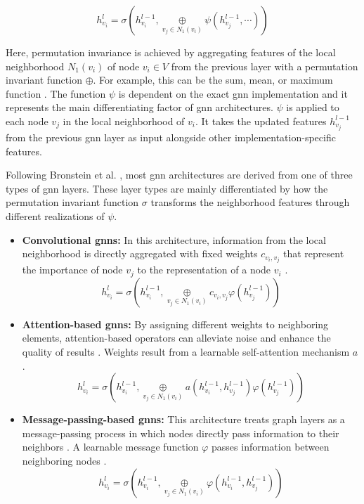 \begin{equation}
    h_{v_i}^l = \sigma(h_{v_i}^{l-1}, \underset{v_j \in N_1(v_i)}{\oplus} \psi(h_{v_j}^{l-1}, \cdots))
\end{equation}

Here, permutation invariance is achieved by aggregating features of the local neighborhood $N_1(v_i)$ of node $v_i \in V$ from the previous layer with a permutation invariant function $\oplus$. For example, this can be the sum, mean, or maximum function \cite{bronstein_geometric_2021}. The function $\psi$ is dependent on the exact \gls{gnn} implementation and it represents the main differentiating factor of \gls{gnn} architectures. $\psi$ is applied to each node $v_j$ in the local neighborhood of $v_i$. It takes the updated features $h_{v_j}^{l-1}$ from the previous \gls{gnn} layer as input alongside other implementation-specific features.

Following Bronstein et al. \cite{bronstein_geometric_2021}, most \gls{gnn} architectures are derived from one of three types of \gls{gnn} layers. These layer types are mainly differentiated by how the permutation invariant function $\sigma$ transforms the neighborhood features through different realizations of $\psi$.

\begin{itemize}
    \item \textbf{Convolutional \glspl{gnn}:} In this architecture, information from the local neighborhood is directly aggregated with fixed weights $c_{v_i, v_j}$ that represent the importance of node $v_j$ to the representation of a node $v_i$ \cite{bronstein_geometric_2021, wu_comprehensive_2021}.
    \begin{equation}
        h_{v_i}^l = \sigma(h_{v_i}^{l-1}, \underset{v_j \in N_1(v_i)}{\oplus} c_{v_i, v_j} \varphi(h_{v_j}^{l-1}))
    \end{equation}
    
    \item \textbf{Attention-based \glspl{gnn}:} By assigning different weights to neighboring elements, attention-based operators can alleviate noise and enhance the quality of results \cite{zhou_graph_2020}. Weights result from a learnable self-attention mechanism $a$ \cite{bronstein_geometric_2021}.
    \begin{equation}
        h_{v_i}^l = \sigma(h_{v_i}^{l-1}, \underset{v_j \in N_1(v_i)}{\oplus} a(h_{v_i}^{l-1}, h_{v_j}^{l-1}) \varphi(h_{v_j}^{l-1}))
    \end{equation}

    \item \textbf{Message-passing-based \glspl{gnn}:} This architecture treats graph layers as a message-passing process in which nodes directly pass information to their neighbors \cite{wu_comprehensive_2021}. A learnable message function $\varphi$ passes information between neighboring nodes \cite{bronstein_geometric_2021}.
    \begin{equation}
        h_{v_i}^l = \sigma(h_{v_i}^{l-1}, \underset{v_j \in N_1(v_i)}{\oplus} \varphi(h_{v_i}^{l-1}, h_{v_j}^{l-1}))
    \end{equation}
\end{itemize}

